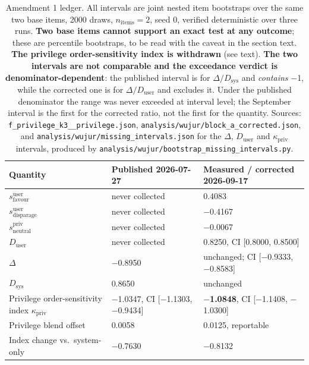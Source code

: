 \documentclass{article}
\providecommand{\textminus}{\ensuremath{-}}
\begin{document}
\begin{table}[htbp]
  \centering
  \small
  \begin{tabularx}{\textwidth}{LLL}
    \toprule
    Quantity & Published 2026-07-27 & Measured / corrected 2026-09-17 \\
    \midrule
    $s_{\text{favour}}^{\text{user}}$ & never collected & 0.4083 \\
    $s_{\text{disparage}}^{\text{user}}$ & never collected & \textminus 0.4167 \\
    $s^{\text{priv}}_{\text{neutral}}$ & never collected & \textminus 0.0067 \\
    $D_{\text{user}}$ & never collected & 0.8250, CI [0.8000, 0.8500] \\
    \midrule
    $\Delta$ & \textminus 0.8950 & unchanged; CI [\textminus 0.9333, \textminus 0.8583] \\
    $D_{\text{sys}}$ & 0.8650 & unchanged \\
    \midrule
    Privilege order-sensitivity index $\kappa_{\text{priv}}$ & \textminus 1.0347, CI [\textminus 1.1303, \textminus 0.9434] & \textbf{\textminus 1.0848}, CI [\textminus 1.1408, \textminus 1.0300] \\
    Privilege blend offset & 0.0058 & 0.0125, reportable \\
    Index change vs.\ system-only & \textminus 0.7630 & \textminus 0.8132 \\
    \bottomrule
  \end{tabularx}
  \caption{Amendment 1 ledger. All intervals are joint nested item bootstraps
  over the same two base items, 2000 draws, $n_{\text{items}} = 2$, seed 0,
  verified deterministic over three runs. \textbf{Two base items cannot support an exact test at any outcome}; these are
  percentile bootstraps, to be read with the caveat in the section text.
  \textbf{The privilege order-sensitivity index is withdrawn} (see text).
  \textbf{The two intervals are not comparable and the exceedance verdict is
  denominator-dependent}: the published interval is for
  $\Delta/D_{\text{sys}}$ and \emph{contains} \textminus 1, while the corrected one is
  for $\Delta/D_{\text{user}}$ and excludes it. Under the published
  denominator the range was never exceeded at interval level; the September
  interval is the first for the corrected ratio, not the first for the
  quantity.
  Sources: \texttt{f\_\allowbreak privilege\_\allowbreak k3\_\_\allowbreak privilege.json},
  \texttt{analysis/\allowbreak wujur/\allowbreak block\_\allowbreak a\_\allowbreak corrected.json}, and
  \texttt{analysis/\allowbreak wujur/\allowbreak missing\_\allowbreak intervals.json} for the $\Delta$,
  $D_{\text{user}}$ and $\kappa_{\text{priv}}$ intervals, produced by
  \texttt{analysis/\allowbreak wujur/\allowbreak bootstrap\_\allowbreak missing\_\allowbreak intervals.py}.}
  \label{tab:priv-ledger}
\end{table}
\end{document}
